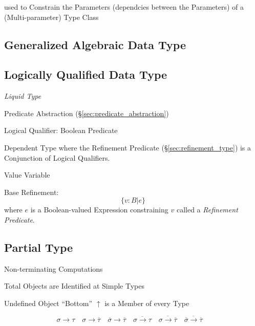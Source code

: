 used to Constrain the Parameters (dependcies between the Parameters)
of a (Multi-parameter) Type Class




\subsection{Generalized Algebraic Data Type}\label{sec:gadt}

\subsection{Logically Qualified Data Type}
\label{sec:logically_qualified}

\cite{rondon-kawaguchi-jhala08}

\emph{Liquid Type}

Predicate Abstraction (\S\ref{sec:predicate_abstraction})

Logical Qualifier: Boolean Predicate

Dependent Type where the Refinement Predicate
(\S\ref{sec:refinement_type}) is a Conjunction of Logical Qualifiers.

Value Variable

Base Refinement:
\[
  \{ v : B | e \}
\]
where $e$ is a Boolean-valued Expression constraining $v$ called a
\emph{Refinement Predicate}.



\subsection{Partial Type}\label{sec:partial_type}

\cite{thompson99}

Non-terminating Computations

Total Objects are Identified at Simple Types

Undefined Object ``Bottom'' $\uparrow$ is a Member of every Type

\[
  \sigma \rightarrow \tau \quad
  \sigma \rightarrow \overline{\tau} \quad
  \overline{\sigma} \rightarrow \overline{\tau} \quad
  \overline{\sigma \rightarrow \tau} \quad
  \overline{\sigma \rightarrow \overline{\tau}} \quad
  \overline{\overline{\sigma} \rightarrow \overline{\tau}} \quad
\]



